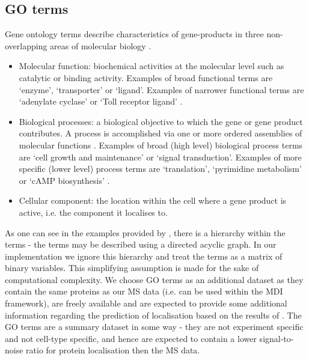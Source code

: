 \documentclass[11pt]{article} %
\begin{document}
\subsection{GO terms}
Gene ontology terms describe characteristics of gene-products in three non-overlapping areas of molecular biology \cite{GeneOntologyConsortiumGeneOntologyGO2004}.

\begin{itemize}
 \item Molecular function: biochemical activities at the molecular level such as catalytic or binding activity. Examples of broad functional terms are ‘enzyme’, ‘transporter’ or ‘ligand’. Examples of narrower functional terms are ‘adenylate cyclase’ or ‘Toll receptor ligand’ \cite{AshburnerGeneOntologytool2000}.
 \item Biological processes: a biological objective to which the gene or gene product contributes. A process is accomplished via one or more ordered assemblies of molecular functions \cite{AshburnerGeneOntologytool2000}. Examples of broad (high level) biological process terms are ‘cell growth and maintenance’ or ‘signal transduction’. Examples of more specific (lower level) process terms are ‘translation’, ‘pyrimidine metabolism’ or ‘cAMP biosynthesis’ \cite{AshburnerGeneOntologytool2000}.
 \item Cellular component: the location within the cell where a gene product is active, i.e. the component it localises to.
\end{itemize}
As one can see in the examples provided by \citet{AshburnerGeneOntologytool2000}, there is a hierarchy within the terms - the terms may be described using a directed acyclic graph. In our implementation we ignore this hierarchy and treat the terms as a matrix of binary variables. This simplifying assumption is made for the sake of computational complexity. We choose GO terms as an additional dataset as they contain the same proteins as our MS data (i.e. can be used within the MDI framework), are freely available and are expected to provide some additional information regarding the prediction of localisation based on the results of \citet{BreckelsLearningHeterogeneousData2016a}. The GO terms are a summary dataset in some way - they are not experiment specific and not cell-type specific, and hence are expected to contain a lower signal-to-noise ratio for protein localisation then the MS data.
\end{document}
